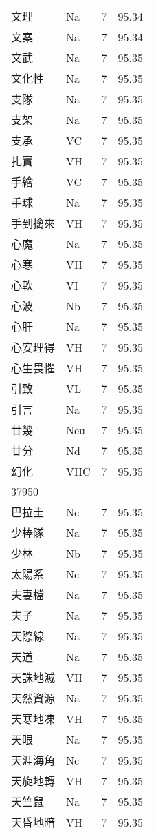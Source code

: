 \documentclass[twocolumn]{book}
\begin{document}
\begin{supertabular}{llrr}
文理 & Na & 7 &  95.34\\
文案 & Na & 7 &  95.34\\
文武 & Na & 7 &  95.35\\
文化性 & Na & 7 &  95.35\\
支隊 & Na & 7 &  95.35\\
支架 & Na & 7 &  95.35\\
支承 & VC & 7 &  95.35\\
扎實 & VH & 7 &  95.35\\
手繪 & VC & 7 &  95.35\\
手球 & Na & 7 &  95.35\\
手到擒來 & VH & 7 &  95.35\\
心魔 & Na & 7 &  95.35\\
心寒 & VH & 7 &  95.35\\
心軟 & VI & 7 &  95.35\\
心波 & Nb & 7 &  95.35\\
心肝 & Na & 7 &  95.35\\
心安理得 & VH & 7 &  95.35\\
心生畏懼 & VH & 7 &  95.35\\
引致 & VL & 7 &  95.35\\
引言 & Na & 7 &  95.35\\
廿幾 & Neu & 7 &  95.35\\
廿分 & Nd & 7 &  95.35\\
幻化 & VHC & 7 &  95.35\\
37950\\
巴拉圭 & Nc & 7 &  95.35\\
少棒隊 & Na & 7 &  95.35\\
少林 & Nb & 7 &  95.35\\
太陽系 & Nc & 7 &  95.35\\
夫妻檔 & Na & 7 &  95.35\\
夫子 & Na & 7 &  95.35\\
天際線 & Na & 7 &  95.35\\
天道 & Na & 7 &  95.35\\
天誅地滅 & VH & 7 &  95.35\\
天然資源 & Na & 7 &  95.35\\
天寒地凍 & VH & 7 &  95.35\\
天眼 & Na & 7 &  95.35\\
天涯海角 & Nc & 7 &  95.35\\
天旋地轉 & VH & 7 &  95.35\\
天竺鼠 & Na & 7 &  95.35\\
天昏地暗 & VH & 7 &  95.35\\

\end{supertabular}
\end{document}
